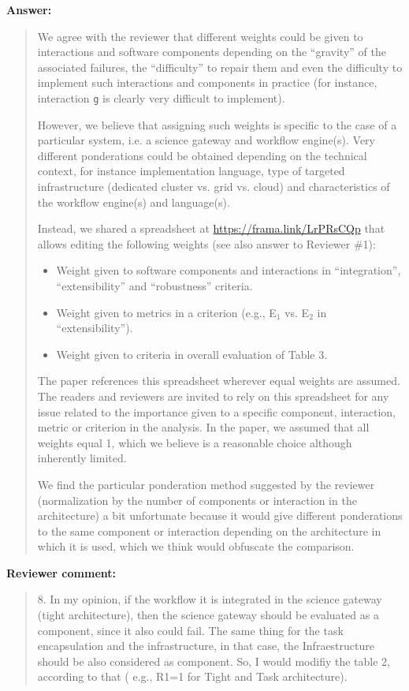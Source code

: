 \documentclass[a4]{article}
\newenvironment{review}%
{\textbf{Reviewer comment:}\begin{quote}}%
{\end{quote}}%
\newenvironment{answer}%
{\textbf{Answer:}\begin{small}\begin{quote}}%
{\end{quote}\end{small}}%
\begin{document}
\begin{answer}
  We agree with the reviewer that different weights could be given to
  interactions and software components depending on the ``gravity'' of
  the associated failures, the ``difficulty'' to repair them and even
  the difficulty to implement such interactions and components in
  practice (for instance, interaction \texttt{g} is clearly very
  difficult to implement).

  However, we believe that assigning such weights is specific to the
  case of a particular system, i.e. a science gateway and workflow
  engine(s). Very different ponderations could be obtained depending
  on the technical context, for instance implementation language, type
  of targeted infrastructure (dedicated cluster vs. grid vs. cloud)
  and characteristics of the workflow engine(s) and language(s).

  Instead, we shared a spreadsheet at
  \url{https://frama.link/LrPRsCQp} that allows editing the following
  weights (see also answer to Reviewer \#1):
  \begin{itemize}
  \item Weight given to software components and interactions in
  ``integration'', ``extensibility'' and ``robustness'' criteria.
  \item Weight given to metrics in a criterion (e.g., E$_1$ vs. E$_2$ in
  ``extensibility'').
  \item Weight given to criteria in overall evaluation of Table 3.
\end{itemize}
The paper references this spreadsheet wherever equal weights are
assumed. The readers and reviewers are invited to rely on this
spreadsheet for any issue related to the importance given to a
specific component, interaction, metric or criterion in the
analysis. In the paper, we assumed that all weights equal 1, which we
believe is a reasonable choice although inherently limited.

We find the particular ponderation method suggested by the reviewer
(normalization by the number of components or interaction in the
architecture) a bit unfortunate because it would give different
ponderations to the same component or interaction depending on the
architecture in which it is used, which we think would obfuscate the
comparison.
\end{answer}

\begin{review}
8. In my opinion, if the workflow it is integrated in the science
gateway (tight architecture), then the science gateway should be
evaluated as a component, since it also could fail. The same thing for
the task encapsulation and the infrastructure, in that case, the
Infraestructure should be also considered as component. So, I would
modifiy the table 2, according to that ( e.g., R1=1 for Tight and Task
architecture).
\end{review}
\end{document}
